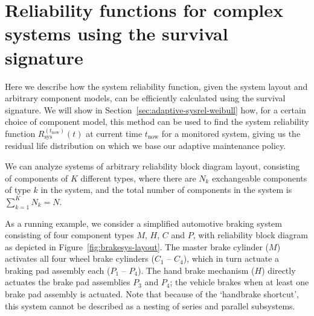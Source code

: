 \documentclass[authoryear]{elsarticle}
\def\tnow{t_\text{now}}
\newcommand{\Rsysnow}{R^{(t_\text{now})}_\text{sys}}
\begin{document}
\section{Reliability functions for complex systems using the survival signature}
\label{sec:sysrel}

Here we describe how the system reliability function, given the system layout and arbitrary component models,
can be efficiently calculated using the survival signature.
We will show in Section~\ref{sec:adaptive-sysrel-weibull} how, for a certain choice of component model,
this method can be used to find the system reliability function $\Rsysnow(t)$ at current time $\tnow$ for a monitored system,
giving us the residual life distribution on which we base our adaptive maintenance policy.

We can analyze systems of arbitrary reliability block diagram layout,
consisting of components of $K$ different types,
where there are $N_k$ exchangeable components of type $k$ in the system,
and the total number of components in the system is $\sum_{k=1}^K N_k = N$.

As a running example, we consider a simplified automotive braking system
consisting of four component types $M$, $H$, $C$ and $P$,
with reliability block diagram as depicted in Figure~\ref{fig:brakesys-layout}.
The master brake cylinder ($M$) activates all four wheel brake cylinders ($C_1$ -- $C_4$),
which in turn actuate a braking pad assembly each ($P_1$ -- $P_4$).
The hand brake mechanism ($H$) directly actuates the brake pad assemblies $P_3$ and $P_4$;
the vehicle brakes when at least one brake pad assembly is actuated.
Note that because of the `handbrake shortcut', this system cannot be described as a nesting of series and parallel subsystems.
\end{document}
